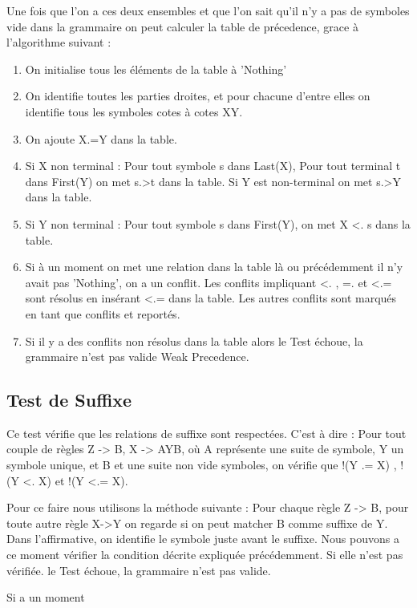 		Une fois que l'on a ces deux ensembles et que l'on sait qu'il n'y a pas de symboles vide dans
		la grammaire on  peut calculer la table de précedence, grace à l'algorithme suivant :
		\begin{enumerate}
			\item On initialise tous les éléments de la table à 'Nothing'
			\item On identifie toutes les parties droites, et pour chacune d'entre elles on identifie tous les
			symboles cotes à cotes XY.
			\item On ajoute X.=Y dans la table.
			\item Si X non terminal : Pour tout symbole s dans Last(X), Pour tout terminal t dans First(Y)
				on met s.>t dans la table. Si Y est non-terminal on met s.>Y dans la table.
			\item Si Y non terminal : Pour tout symbole s dans First(Y), on met X <. s dans la table.
			\item Si à un moment on met une relation dans la table là ou précédemment il n'y avait pas 'Nothing',
				on a un conflit. Les conflits impliquant <. , =. et <.= sont résolus en insérant <.= dans
				la table. Les autres conflits sont marqués en tant que conflits et reportés. 
			\item Si il y a des conflits non résolus dans la table alors le Test échoue, la grammaire n'est pas valide
			Weak Precedence.
		\end{enumerate}
	\subsection{Test de Suffixe}
		Ce test vérifie que les relations de suffixe sont respectées. C'est à dire :
		Pour tout couple de règles Z -> B, X -> AYB, où A représente une suite de symbole, Y un symbole unique,
		et B et une suite non vide symboles, on vérifie que !(Y .= X) , !(Y <. X) et !(Y <.= X).
		
		Pour ce faire nous utilisons la méthode suivante : 
		Pour chaque règle Z -> B, pour toute autre règle X->Y on regarde si on peut matcher B comme suffixe de Y.
		Dans l'affirmative, on identifie le symbole juste avant le suffixe. Nous pouvons a ce moment vérifier la
		condition décrite expliquée précédemment. Si elle n'est pas vérifiée. le Test échoue, la grammaire n'est pas valide.

		Si a un moment
